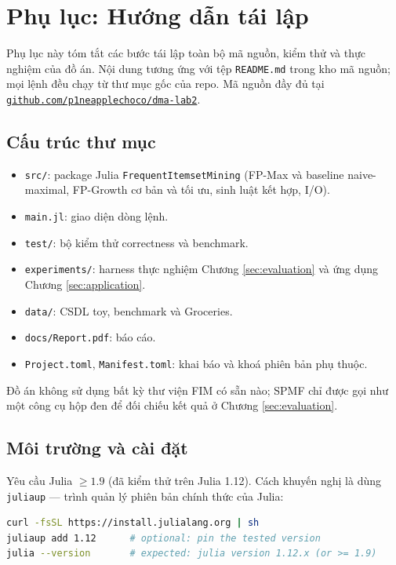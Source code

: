 \section{Phụ lục: Hướng dẫn tái lập}
\label{sec:appendix-repro}

Phụ lục này tóm tắt các bước tái lập toàn bộ mã nguồn, kiểm thử và thực nghiệm của đồ án. Nội dung tương ứng với tệp \texttt{README.md} trong kho mã nguồn; mọi lệnh đều chạy từ thư mục gốc của repo. Mã nguồn đầy đủ tại \href{https://github.com/p1neapplechoco/dma-lab2.git}{\texttt{github.com/p1neapplechoco/dma-lab2}}.

\subsection{Cấu trúc thư mục}

\begin{itemize}
    \item \texttt{src/}: package Julia \texttt{FrequentItemsetMining} (FP-Max và baseline naive-maximal, FP-Growth cơ bản và tối ưu, sinh luật kết hợp, I/O).
    \item \texttt{main.jl}: giao diện dòng lệnh.
    \item \texttt{test/}: bộ kiểm thử correctness và benchmark.
    \item \texttt{experiments/}: harness thực nghiệm Chương \ref{sec:evaluation} và ứng dụng Chương \ref{sec:application}.
    \item \texttt{data/}: CSDL toy, benchmark và Groceries.
    \item \texttt{docs/Report.pdf}: báo cáo.
    \item \texttt{Project.toml}, \texttt{Manifest.toml}: khai báo và khoá phiên bản phụ thuộc.
\end{itemize}

Đồ án không sử dụng bất kỳ thư viện FIM có sẵn nào; SPMF chỉ được gọi như một công cụ hộp đen để đối chiếu kết quả ở Chương \ref{sec:evaluation}.

\subsection{Môi trường và cài đặt}

Yêu cầu Julia $\geq 1.9$ (đã kiểm thử trên Julia 1.12). Cách khuyến nghị là dùng \texttt{juliaup} — trình quản lý phiên bản chính thức của Julia:

\begin{lstlisting}[language=bash, caption={Cài Julia bằng juliaup (Linux/macOS) và ghim phiên bản.}]
curl -fsSL https://install.julialang.org | sh
juliaup add 1.12      # optional: pin the tested version
julia --version       # expected: julia version 1.12.x (or >= 1.9)
\end{lstlisting}

